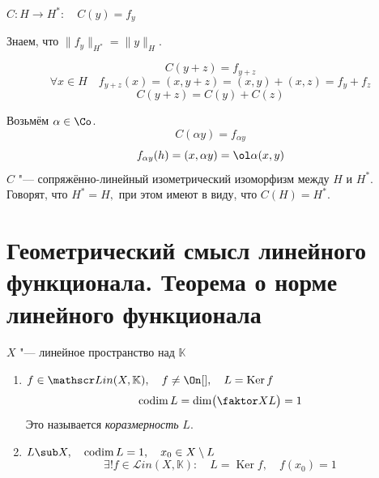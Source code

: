 \begin{remark}
	$ C : H \to H^* : \quad C(y) = f_y $

	Знаем, что $ \|f_y\|_{H^*} = \|y\|_H $.

	$$ C(y + z) = f_{y + z} $$
	$$ \forall x \in H \quad f_{y + z}(x) = (x, y + z) = (x, y) + (x, z) = f_y + f_z $$
	$$ C(y + z) = C(y) + C(z) $$

	Возьмём $ \alpha \in \Co $.
	$$ C(\alpha y) = f_{\alpha y} $$
	$$ f_{\alpha y}(h) = (x, \alpha y) = \ol\alpha (x, y) $$
	$ C $ "--- сопряжённо-линейный изометрический изоморфизм между $ H $ и $ H^* $.
	Говорят, что $ H^* = H, $ при этом имеют в виду, что $ C(H) = H^* $.
\end{remark}

\section{Геометрический смысл линейного функционала.
Теорема о норме линейного функционала}

\begin{theorem}
	$ X $ "--- линейное пространство над $ \mathbb K $
	\begin{enumerate}
		\item $ f \in \mathscr Lin(X, \mathbb K), \quad
			f \ne \On[], \quad L = \operatorname{Ker} f $
			$$ \operatorname{codim} L = \dim \bigl( \faktor X L \bigr) = 1 $$
			Это называется \emph{коразмерность} $ L $.
		\item $ L \sub X, \quad \operatorname{codim} L = 1, \quad x_0 \in X \setminus L $
			$$ \exists ! f \in \mathscr Lin(X, \mathbb K) : \quad L = \operatorname{Ker} f, \quad
			f(x_0) = 1 $$
	\end{enumerate}
\end{theorem}

